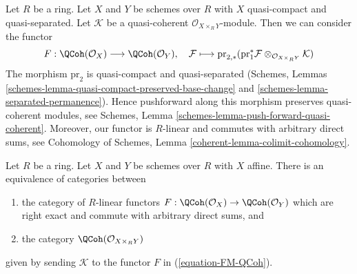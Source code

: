 \begin{example}
\label{example-functor-quasi-coherent}
Let $R$ be a ring. Let $X$ and $Y$ be
schemes over $R$ with $X$ quasi-compact and quasi-separated.
Let $\mathcal{K}$ be a quasi-coherent $\mathcal{O}_{X \times_R Y}$-module.
Then we can consider the functor
\begin{equation}
\label{equation-FM-QCoh}
F : \QCoh(\mathcal{O}_X) \longrightarrow \QCoh(\mathcal{O}_Y),\quad
\mathcal{F} \longmapsto
\text{pr}_{2, *}(\text{pr}_1^*\mathcal{F}
\otimes_{\mathcal{O}_{X \times_R Y}} \mathcal{K})
\end{equation}
The morphism $\text{pr}_2$ is quasi-compact and quasi-separated
(Schemes, Lemmas \ref{schemes-lemma-quasi-compact-preserved-base-change}
and \ref{schemes-lemma-separated-permanence}). Hence pushforward along
this morphism preserves quasi-coherent modules, see
Schemes, Lemma \ref{schemes-lemma-push-forward-quasi-coherent}.
Moreover, our functor is $R$-linear and commutes with arbitrary direct sums,
see Cohomology of Schemes, Lemma \ref{coherent-lemma-colimit-cohomology}.
\end{example}

\begin{lemma}
\label{lemma-functor-quasi-coherent-from-affine}
Let $R$ be a ring. Let $X$ and $Y$ be schemes over $R$ with $X$ affine.
There is an equivalence of categories between
\begin{enumerate}
\item the category of $R$-linear functors
$F : \QCoh(\mathcal{O}_X) \to \QCoh(\mathcal{O}_Y)$
which are right exact and commute with arbitrary direct sums, and
\item the category $\QCoh(\mathcal{O}_{X \times_R Y})$
\end{enumerate}
given by sending $\mathcal{K}$ to the functor $F$ in (\ref{equation-FM-QCoh}).
\end{lemma}

